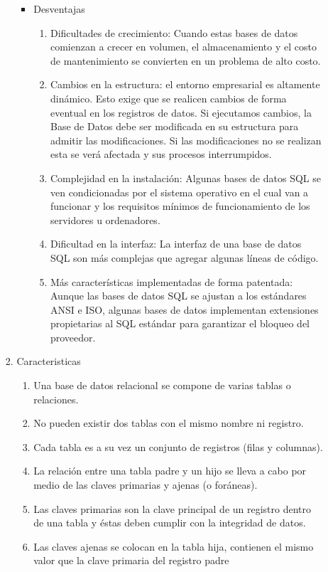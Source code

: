 \documentclass[12pt,a4paper,oneside]{book}
\begin{document}
\begin{enumerate}
\begin{enumerate}
\begin{enumerate}
\begin{itemize}
						\item Desventajas
						
						\begin{enumerate}
							
							\item Dificultades de crecimiento: Cuando estas bases de datos comienzan a crecer en volumen, el almacenamiento y el costo de mantenimiento se convierten en un problema de alto costo.
							\item Cambios en la estructura: el entorno empresarial es altamente dinámico. Esto exige que se realicen cambios de forma eventual en los registros de datos. Si ejecutamos cambios, la Base de Datos debe ser modificada en su estructura para admitir las modificaciones. Si las modificaciones no se realizan esta se verá afectada y sus procesos interrumpidos.
							\item Complejidad en la instalación: Algunas bases de datos SQL se ven condicionadas por el sistema operativo en el cual van a funcionar y los requisitos mínimos de funcionamiento de los servidores u ordenadores.
							\item Dificultad en la interfaz: La interfaz de una base de datos SQL son más complejas que agregar algunas líneas de código.
							\item Más características implementadas de forma patentada: Aunque las bases de datos SQL se ajustan a los estándares ANSI e ISO, algunas bases de datos implementan extensiones propietarias al SQL estándar para garantizar el bloqueo del proveedor.
							
						\end{enumerate}
					
					\end{itemize}
			\item Caracteristicas
				\begin{enumerate}
					
					\item Una base de datos relacional se compone de varias tablas o relaciones. 
					\item No pueden existir dos tablas con el mismo nombre ni registro. 
					\item Cada tabla es a su vez un conjunto de registros (filas y columnas). 
					\item La relación entre una tabla padre y un hijo se lleva a cabo por medio de las claves primarias y ajenas (o foráneas). 
					\item Las claves primarias son la clave principal de un registro dentro de una tabla y éstas deben cumplir con la integridad de datos. 
					\item Las claves ajenas se colocan en la tabla hija, contienen el mismo valor que la clave primaria del registro padre
					

\end{enumerate}
\end{enumerate}
\end{enumerate}
\end{enumerate}
\end{document}
